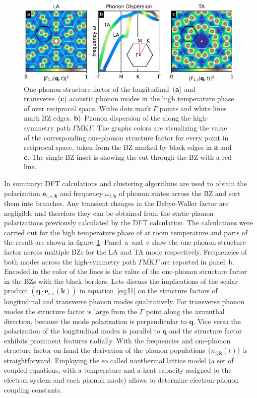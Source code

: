 \begin{figure}[!t]
	\includegraphics[width=\columnwidth]{figs/ops.pdf}
	\caption{One-phonon structure factor of the longitudinal~(\textbf{a}) and transverse~(\textbf{c}) acoustic phonon modes in the high temperature phase of \ts over reciprocal space. Withe dots mark $\Gamma$ points and white lines mark \ac{BZ} edges. \textbf{b})~Phonon dispersion of the along the high-symmetry path $\overline{\Gamma\mathrm{MK}\Gamma}$. The graphs colors are visualizing the value of the corresponding one-phonon structure factor for every point in reciprocal space, taken from the \ac{BZ} marked by black edges in \textbf{a} and \textbf{c}. The single \ac{BZ} inset is showing the cut through the \ac{BZ} with a red line.}
	\label{fig:ops}
\end{figure}

In summary: \Ac{DFT} calculations and clustering algorithms are used to obtain the polarization $\mathbf{e}_{i,s,\mathbf{k}}$ and frequency $\omega_{i,\mathbf{k}}$ of phonon states across the \ac{BZ} and sort them into branches.
Any transient changes in the Debye-Waller factor are negligible and therefore they can be obtained from the static phonon polarizations previously calculated by the \ac{DFT} calculation.
The calculations were carried out for the high temperature phase of \ts at room temperature and parts of the result are shown in figure~\ref{fig:ops}.
Panel~a~and~c show the one-phonon structure factor across multiple \acp{BZ} for the \ac{LA} and \ac{TA} mode respectively.
Frequencies of both modes across the high-symmetry path $\overline{\Gamma\mathrm{MK}\Gamma}$ are reported in panel~b.
Encoded in the color of the lines is the value of the one-phonon structure factor in the \acp{BZ} with the black borders.
Lets discuss the implications of the scalar product $\left( \mathbf{q}\cdot\mathbf{e}_{i, s}(\mathbf{k}) \right)$ in equation~\ref{eq:I1} on the structure factors of longitudinal and transverse phonon modes qualitatively.
For transverse phonon modes the structure factor is large from the $\Gamma$ point along the azimuthal direction, because the mode polarization is perpendicular to $\mathbf{q}$.
Vice versa the polarization of the longitudinal modes is parallel to $\mathbf{q}$ and the structure factor exhibits prominent features radially.
With the frequencies and one-phonon structure factor on hand the derivation of the phonon populations $\{n_{i,\mathbf{k}}(t)\}$ is straightforward.
Employing the so called nonthermal lattice model\cite{waldecker2016} (a set of coupled equations, with a temperature and a heat capacity assigned to the electron system and each phonon mode) allows to determine electron-phonon coupling constants.

